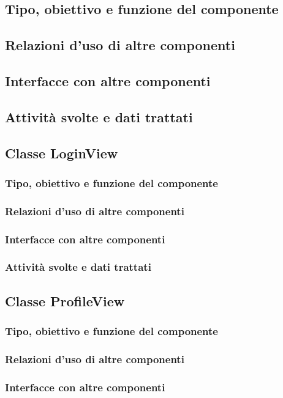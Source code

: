 \subsection*{Tipo, obiettivo e funzione del componente}
\subsection*{Relazioni d'uso di altre componenti}
\subsection*{Interfacce con altre componenti}
\subsection*{Attivit\`a svolte e dati trattati}

\subsection{Classe LoginView}
\subsubsection*{Tipo, obiettivo e funzione del componente}
\subsubsection*{Relazioni d'uso di altre componenti}
\subsubsection*{Interfacce con altre componenti}
\subsubsection*{Attivit\`a svolte e dati trattati}

\subsection{Classe ProfileView}
\subsubsection*{Tipo, obiettivo e funzione del componente}
\subsubsection*{Relazioni d'uso di altre componenti}
\subsubsection*{Interfacce con altre componenti}
